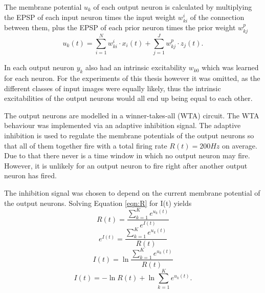 The membrane potential $u_k$ of each output neuron is calculated by multiplying the EPSP of each input neuron times the input weight $w^{i}_{ki}$ of the connection between them, plus the EPSP of each prior neuron times the prior weight $w^{p}_{kj}$
\begin{equation}
\label{eqn:uk}
u_k(t) = \sum_{i=1}^N w^{i}_{ki} \cdot x_i(t) + \sum_{j=1}^J w^{p}_{kj} \cdot z_j(t).
\end{equation}

In \citet{nessler} each output neuron $y_k$ also had an intrinsic excitability $w_{k0}$ which was learned for each neuron. For the experiments of this thesis however it was omitted, as the different classes of  input images were equally likely, thus the intrinsic excitabilities of the output neurons would all end up being equal to each other.

The output neurons are modelled in a winner-takes-all (WTA) circuit. The WTA behaviour was implemented via an adaptive inhibition signal. The adaptive inhibition is used to regulate the membrane potentials of the output neurons so that all of them together fire with a total firing rate $R(t) = 200 Hz$ on average. Due to that there never is a time window in which no output neuron may fire. However, it is unlikely for an output neuron to fire right after another output neuron has fired.

The inhibition signal was chosen to depend on the current membrane potential of the output neurons. 
Solving Equation \ref{eqn:R} for I(t) yields
\begin{equation}
\label{}
R(t) = \frac{ \sum_{k=1}^K e^{u_k(t)}}{e^{I(t)}}
\end{equation}
\begin{equation}
\label{}
e^{I(t)} = \frac{\sum_{k=1}^K e^{u_k(t)}}{R(t)}
\end{equation}
\begin{equation}
\label{}
I(t) = \ln{ \frac{ \sum_{k=1}^K e^{u_k(t)}}{R(t)}}
\end{equation}
\begin{equation}
\label{eqn:I(t)}
I(t) =  - \ln{R(t)} + \ln{  \sum_{k=1}^K e^{u_k(t)}}.
\end{equation}

